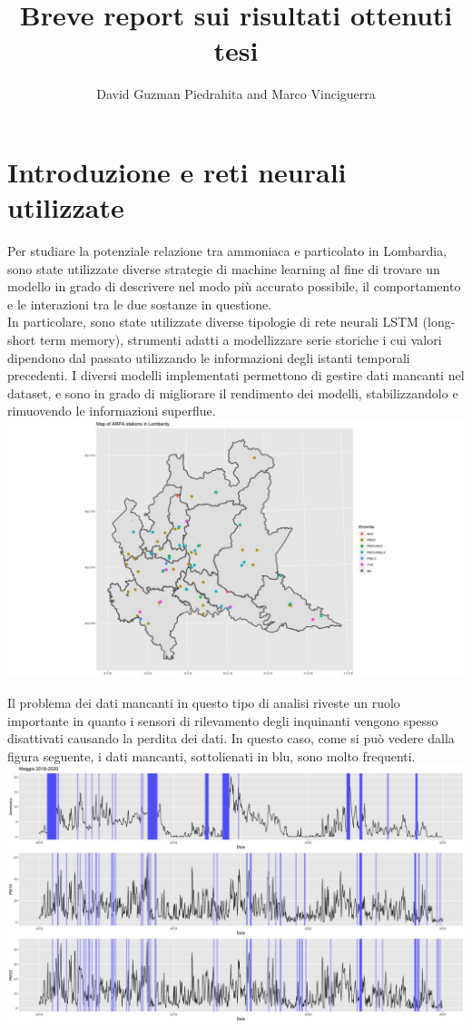 \documentclass{article}
\title{Breve report sui risultati ottenuti tesi}
\author{David Guzman Piedrahita and Marco Vinciguerra}
\begin{document}
\maketitle        
\section{Introduzione e reti neurali utilizzate}
Per studiare la potenziale relazione tra ammoniaca e particolato in Lombardia, sono state utilizzate
diverse strategie di machine learning al fine di trovare un modello in grado di descrivere 
nel modo più accurato possibile, il comportamento e le interazioni tra le due 
sostanze in questione. 
\\In particolare, sono state utilizzate diverse tipologie di rete neurali LSTM (long-short term memory),
strumenti adatti a modellizzare serie storiche i cui valori dipendono dal passato utilizzando le informazioni degli
istanti temporali precedenti. I diversi modelli implementati permettono di 
gestire dati mancanti nel dataset, e sono in grado
di migliorare il rendimento dei modelli, stabilizzandolo e rimuovendo le informazioni superflue.
    \includegraphics[scale=0.4]{Immagini/mappaTipologie.jpeg}

Il problema dei dati mancanti in questo tipo di analisi riveste un ruolo importante
in quanto i sensori di rilevamento degli inquinanti vengono spesso disattivati causando la perdita 
dei dati. In questo caso, come si può vedere dalla figura seguente, i dati mancanti, sottolienati in blu, sono molto frequenti.
\\\includegraphics[scale=0.4]{Immagini/Moggio 2018-2020.jpeg}
    
\end{document}
